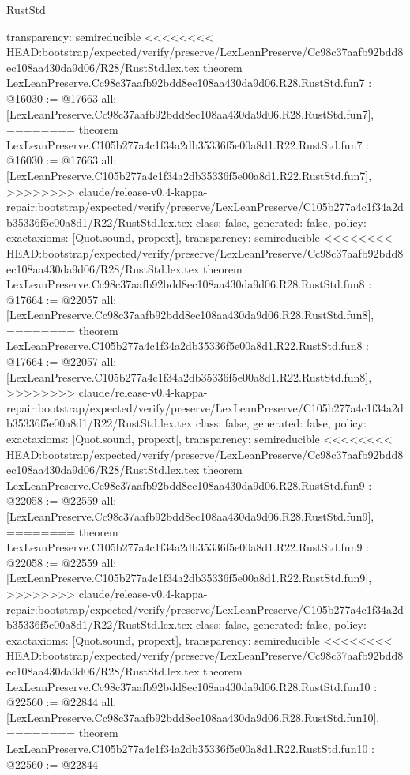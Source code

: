 \begin{lexlean}{RustStd}
\begin{coremodule}
{\begin{coremodule}
{{{{{{{{{{  transparency: semireducible
}
<<<<<<<< HEAD:bootstrap/expected/verify/preserve/LexLeanPreserve/Cc98c37aafb92bdd8ec108aa430da9d06/R28/RustStd.lex.tex
theorem LexLeanPreserve.Cc98c37aafb92bdd8ec108aa430da9d06.R28.RustStd.fun7 : @16030 := @17663 {
  all: [LexLeanPreserve.Cc98c37aafb92bdd8ec108aa430da9d06.R28.RustStd.fun7],
========
theorem LexLeanPreserve.C105b277a4c1f34a2db35336f5e00a8d1.R22.RustStd.fun7 : @16030 := @17663 {
  all: [LexLeanPreserve.C105b277a4c1f34a2db35336f5e00a8d1.R22.RustStd.fun7],
>>>>>>>> claude/release-v0.4-kappa-repair:bootstrap/expected/verify/preserve/LexLeanPreserve/C105b277a4c1f34a2db35336f5e00a8d1/R22/RustStd.lex.tex
  class: false,
  generated: false,
  policy: exact{axioms: [Quot.sound, propext]},
  transparency: semireducible
}
<<<<<<<< HEAD:bootstrap/expected/verify/preserve/LexLeanPreserve/Cc98c37aafb92bdd8ec108aa430da9d06/R28/RustStd.lex.tex
theorem LexLeanPreserve.Cc98c37aafb92bdd8ec108aa430da9d06.R28.RustStd.fun8 : @17664 := @22057 {
  all: [LexLeanPreserve.Cc98c37aafb92bdd8ec108aa430da9d06.R28.RustStd.fun8],
========
theorem LexLeanPreserve.C105b277a4c1f34a2db35336f5e00a8d1.R22.RustStd.fun8 : @17664 := @22057 {
  all: [LexLeanPreserve.C105b277a4c1f34a2db35336f5e00a8d1.R22.RustStd.fun8],
>>>>>>>> claude/release-v0.4-kappa-repair:bootstrap/expected/verify/preserve/LexLeanPreserve/C105b277a4c1f34a2db35336f5e00a8d1/R22/RustStd.lex.tex
  class: false,
  generated: false,
  policy: exact{axioms: [Quot.sound, propext]},
  transparency: semireducible
}
<<<<<<<< HEAD:bootstrap/expected/verify/preserve/LexLeanPreserve/Cc98c37aafb92bdd8ec108aa430da9d06/R28/RustStd.lex.tex
theorem LexLeanPreserve.Cc98c37aafb92bdd8ec108aa430da9d06.R28.RustStd.fun9 : @22058 := @22559 {
  all: [LexLeanPreserve.Cc98c37aafb92bdd8ec108aa430da9d06.R28.RustStd.fun9],
========
theorem LexLeanPreserve.C105b277a4c1f34a2db35336f5e00a8d1.R22.RustStd.fun9 : @22058 := @22559 {
  all: [LexLeanPreserve.C105b277a4c1f34a2db35336f5e00a8d1.R22.RustStd.fun9],
>>>>>>>> claude/release-v0.4-kappa-repair:bootstrap/expected/verify/preserve/LexLeanPreserve/C105b277a4c1f34a2db35336f5e00a8d1/R22/RustStd.lex.tex
  class: false,
  generated: false,
  policy: exact{axioms: [Quot.sound, propext]},
  transparency: semireducible
}
<<<<<<<< HEAD:bootstrap/expected/verify/preserve/LexLeanPreserve/Cc98c37aafb92bdd8ec108aa430da9d06/R28/RustStd.lex.tex
theorem LexLeanPreserve.Cc98c37aafb92bdd8ec108aa430da9d06.R28.RustStd.fun10 : @22560 := @22844 {
  all: [LexLeanPreserve.Cc98c37aafb92bdd8ec108aa430da9d06.R28.RustStd.fun10],
========
theorem LexLeanPreserve.C105b277a4c1f34a2db35336f5e00a8d1.R22.RustStd.fun10 : @22560 := @22844 {
}}}}}}}}}}}}}}
\end{coremodule}}
\end{coremodule}
\end{lexlean}
